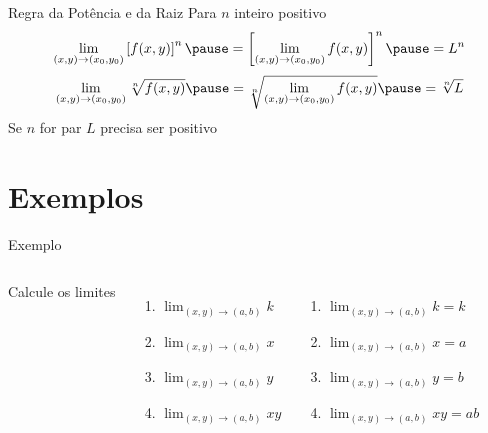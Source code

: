 \begin{frame}{Regra da Potência e da Raiz}
  Para $n$ inteiro positivo
  \pause
  \[
    \lim_{(x, y)\to(x_0, y_0)} \left[f(x, y)\right]^n
    \pause =
    \left[\lim_{(x, y)\to(x_0, y_0)} f(x, y)\right]^n
    \pause =
    L^n
  \]
  \pause
  \vspace{\baselineskip}
  \[
    \lim_{(x, y)\to(x_0, y_0)} \sqrt[n]{f(x, y)}
    \pause =
    \sqrt[n]{\lim_{(x, y)\to(x_0, y_0)} f(x, y)}
    \pause =
    \sqrt[n]{L}
  \]
  \pause
  Se $n$ for par $L$ precisa ser positivo
\end{frame}


\section{Exemplos}

\addtocounter{exemplo}{1}
\begin{frame}{Exemplo \theexemplo}
\begin{columns}
  Calcule os limites
  \begin{enumerate}
    \setlength\itemsep{1.5em}
    \item \(\lim_{(x, y)\to(a, b)} k\)
    \item \(\lim_{(x, y)\to(a, b)} x\)
    \item \(\lim_{(x, y)\to(a, b)} y\)
    \item \(\lim_{(x, y)\to(a, b)} xy\)
  \end{enumerate}
  \pause
  \begin{enumerate}[<+->]
    \setlength\itemsep{1.5em}
    \item \(\lim_{(x, y)\to(a, b)} k  = k  \)
    \item \(\lim_{(x, y)\to(a, b)} x  = a  \)
    \item \(\lim_{(x, y)\to(a, b)} y  = b  \)
    \item \(\lim_{(x, y)\to(a, b)} xy = ab \)
  \end{enumerate}
\end{columns}
\end{frame}


